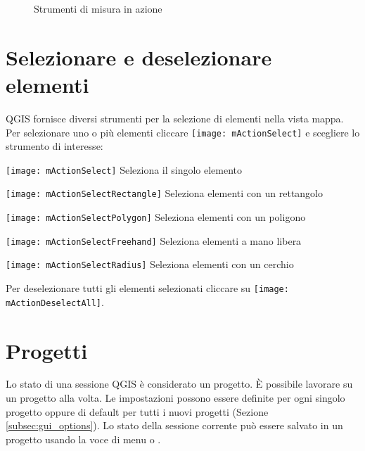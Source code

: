 \begin{figure}[ht]
\centering
     \hspace{0.33cm}
     \hspace{0.33cm}
   \caption{Strumenti di misura in azione \nixcaption} \label{fig:measure}
\end{figure}

\section{Selezionare e deselezionare elementi}\label{sec:selection}

QGIS fornisce diversi strumenti per la selezione di elementi nella vista mappa.
Per selezionare uno o più elementi cliccare  
\texttt{[image: mActionSelect]} e scegliere lo strumento di interesse:

\begin{description}
\item \texttt{[image: mActionSelect]} Seleziona il singolo elemento
\item \texttt{[image: mActionSelectRectangle]} Seleziona elementi con un rettangolo
\item \texttt{[image: mActionSelectPolygon]} Seleziona elementi con un poligono
\item \texttt{[image: mActionSelectFreehand]} Seleziona elementi a mano libera
\item \texttt{[image: mActionSelectRadius]} Seleziona elementi con un cerchio
\end{description} 

Per deselezionare tutti gli elementi selezionati cliccare su \texttt{[image: mActionDeselectAll]}.

\section{Progetti}\label{sec:projects}

Lo stato di una sessione QGIS è considerato un progetto. 
È possibile lavorare su un progetto alla volta. Le impostazioni possono essere definite 
per ogni singolo progetto oppure di default per tutti i nuovi progetti (Sezione \ref{subsec:gui_options}). 
Lo stato della sessione corrente può essere salvato
in un progetto usando la voce di menu \arrow
{}
o  \arrow {}.

